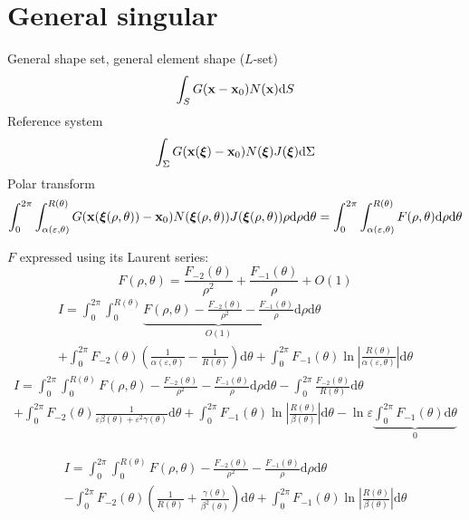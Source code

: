 \documentclass[a4paper,11pt]{article}
\newcommand{\td}{\mathrm{d}}
\begin{document}
\section{General singular}

General shape set, general element shape ($L$-set)
%
\begin{equation}
\int_S G({\bf x}-{\bf x}_0) N({\bf x}) \td S
\end{equation}
%
Reference system
%
\begin{equation}
\int_{\Sigma} G({\bf x}(\bm{\xi})-{\bf x}_0) N(\bm{\xi}) J(\bm{\xi}) \td \Sigma
\end{equation}
%
Polar transform
%
\begin{equation}
\int_{0}^{2\pi}
\int_{\alpha(\varepsilon,\theta)}^{R(\theta)}
G({\bf x}(\bm{\xi}(\rho,\theta))-{\bf x}_0) N(\bm{\xi}(\rho,\theta)) J(\bm{\xi}(\rho,\theta)) \rho
\td \rho
\td \theta
=
\int_{0}^{2\pi}
\int_{\alpha(\varepsilon,\theta)}^{R(\theta)}
F(\rho, \theta)
\td \rho
\td \theta
\end{equation}

$F$ expressed using its Laurent series:
%
\begin{equation}
F(\rho, \theta)
= \frac{F_{-2}(\theta)}{\rho^2}
+ \frac{F_{-1}(\theta)}{\rho}
+ O(1)
\end{equation}
%
\begin{multline}
I =
\int_{0}^{2\pi}
\int_{0}^{R(\theta)}
\underbrace{
F(\rho, \theta) - \frac{F_{-2}(\theta)}{\rho^2} - \frac{F_{-1}(\theta)}{\rho}
}_{O(1)}
\td \rho
\td \theta \\
+
\int_{0}^{2\pi}
F_{-2}(\theta)
\left(
\frac{1}{\alpha(\varepsilon,\theta)}
-\frac{1}{R(\theta)}
\right)
\td \theta
+
\int_{0}^{2\pi}
F_{-1}(\theta)
\ln \left|\frac{R(\theta)}{\alpha(\varepsilon,\theta)}\right|
\td \theta
\end{multline}
%
\begin{multline}
I =
\int_{0}^{2\pi}
\int_{0}^{R(\theta)}
F(\rho, \theta) - \frac{F_{-2}(\theta)}{\rho^2} - \frac{F_{-1}(\theta)}{\rho}
\td \rho
\td \theta
-
\int_{0}^{2\pi}
\frac{F_{-2}(\theta)}{R(\theta)}
\td \theta \\
+
\int_{0}^{2\pi}
F_{-2}(\theta)
\frac{1}{\varepsilon\beta(\theta) + \varepsilon^2\gamma(\theta)}
\td \theta
+
\int_{0}^{2\pi}
F_{-1}(\theta)
\ln \left|\frac{R(\theta)}{\beta(\theta)}\right|
\td \theta
-
\ln \varepsilon
\underbrace{
\int_{0}^{2\pi}
F_{-1}(\theta)
\td \theta}_0
\end{multline}

%
\begin{multline}
I =
\int_{0}^{2\pi}
\int_{0}^{R(\theta)}
F(\rho, \theta) - \frac{F_{-2}(\theta)}{\rho^2} - \frac{F_{-1}(\theta)}{\rho}
\td \rho
\td \theta  \\
-
\int_{0}^{2\pi}
F_{-2}(\theta)\left(\frac{1}{R(\theta)}
+
\frac{\gamma(\theta)}{\beta^2(\theta)}
\right)
\td \theta
+
\int_{0}^{2\pi}
F_{-1}(\theta)
\ln \left|\frac{R(\theta)}{\beta(\theta)}\right|
\td \theta
\end{multline}
\end{document}
